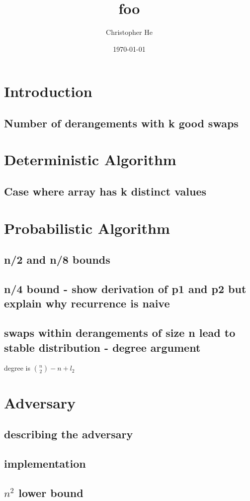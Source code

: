 \documentclass{article}
\title{foo}
\author{Christopher He}
\date{\today}
\begin{document}
\maketitle
\section{Introduction}

\subsection{Number of derangements with k good swaps}
\section{Deterministic Algorithm}
\subsection{Case where array has k distinct values}
\section{Probabilistic Algorithm}
\subsection{n/2 and n/8 bounds}
\subsection{n/4 bound - show derivation of p1 and p2 but explain why recurrence is naive}
\subsection{swaps within derangements of size n lead to stable distribution - degree argument}
degree is ${n \choose 2} - n + l_2 $

\section{Adversary}
\subsection{describing the adversary}
\subsection{implementation}
\subsection{$n^2$ lower bound}
\end{document}
